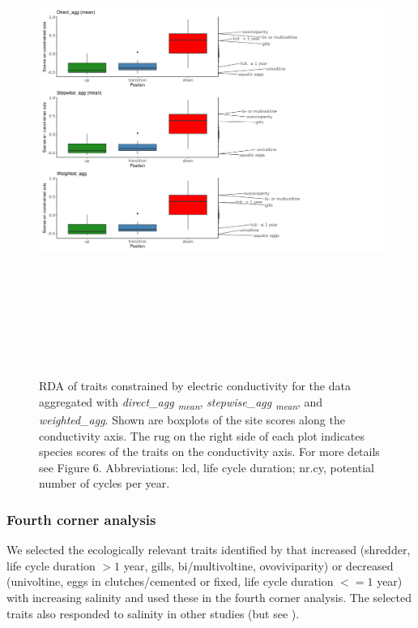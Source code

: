 \documentclass[12pt]{article}
\begin{document}
\begin{figure}[H]
    \centering
    \includegraphics[width=18.5cm, height=16cm]{boxplot_scores_combined_REMAIN_SI.png}
    \caption{RDA of traits constrained by electric conductivity for the data aggregated with \textit{direct\_agg \textsubscript{mean}}, \textit{stepwise\_agg \textsubscript{mean}}, and \textit{weighted\_agg}. Shown are boxplots of the site scores along the conductivity axis. The rug on the right side of each plot indicates species scores of the traits on the conductivity axis. For more details see Figure 6. %
    Abbreviations: lcd, life cycle duration; nr.cy, potential number of cycles per year.}
    \label{fig:boxplots_scores_on_constrained_axis_REMAIN}
\end{figure}

\subsubsection*{Fourth corner analysis}

We selected the ecologically relevant traits identified by \citet{szocs_effects_2014} that increased (shredder, life cycle duration $ > 1 $ year, gills, bi/multivoltine, ovoviviparity) or decreased (univoltine, eggs in clutches/cemented or fixed, life cycle duration $ <= 1$ year) with increasing salinity and used these in the fourth corner analysis. The selected traits also responded to salinity in other studies (but see \cite{szocs_effects_2014}). 
\end{document}
